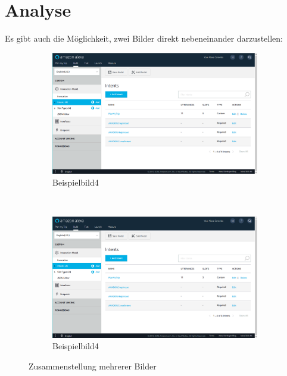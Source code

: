 \section{Analyse}\label{sec:analyse}
Es gibt auch die Möglichkeit, zwei Bilder direkt nebeneinander darzustellen:

  \begin{figure} [ht]
    \centering
    \begin{subfigure}[b]{0.45\textwidth}
        \includegraphics[width=\textwidth]{resources/images/amazon_dev_console.png}
        \caption{Beispielbild4}
        \label{fig:bild4}
    \end{subfigure}
    ~
    \begin{subfigure}[b]{0.45\textwidth}
        \includegraphics[width=\textwidth]{resources/images/amazon_dev_console.png}
        \caption{Beispielbild4}
        \label{fig:bild5}
    \end{subfigure}
    \caption{Zusammenstellung mehrerer Bilder}\label{fig:bild6}
\end{figure}